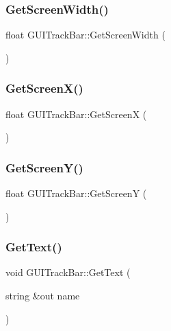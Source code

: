 \subsubsection{\texorpdfstring{Get\+Screen\+Width()}{GetScreenWidth()}}
{\footnotesize\ttfamily float G\+U\+I\+Track\+Bar\+::\+Get\+Screen\+Width (\begin{DoxyParamCaption}{ }\end{DoxyParamCaption})}

\hypertarget{class_g_u_i_track_bar_a0dd72098070247b458c456bf1d77d3c8}{}\label{class_g_u_i_track_bar_a0dd72098070247b458c456bf1d77d3c8} 
\subsubsection{\texorpdfstring{Get\+Screen\+X()}{GetScreenX()}}
{\footnotesize\ttfamily float G\+U\+I\+Track\+Bar\+::\+Get\+ScreenX (\begin{DoxyParamCaption}{ }\end{DoxyParamCaption})}

\hypertarget{class_g_u_i_track_bar_a2408eaab28927a9c2d8dc5a2b0b4516c}{}\label{class_g_u_i_track_bar_a2408eaab28927a9c2d8dc5a2b0b4516c} 
\subsubsection{\texorpdfstring{Get\+Screen\+Y()}{GetScreenY()}}
{\footnotesize\ttfamily float G\+U\+I\+Track\+Bar\+::\+Get\+ScreenY (\begin{DoxyParamCaption}{ }\end{DoxyParamCaption})}

\hypertarget{class_g_u_i_track_bar_a6f4a2a4ccc83da8da713c8ec9cc4ddf9}{}\label{class_g_u_i_track_bar_a6f4a2a4ccc83da8da713c8ec9cc4ddf9} 
\subsubsection{\texorpdfstring{Get\+Text()}{GetText()}}
{\footnotesize\ttfamily void G\+U\+I\+Track\+Bar\+::\+Get\+Text (\begin{DoxyParamCaption}\item[{string \&out}]{name }\end{DoxyParamCaption})}

